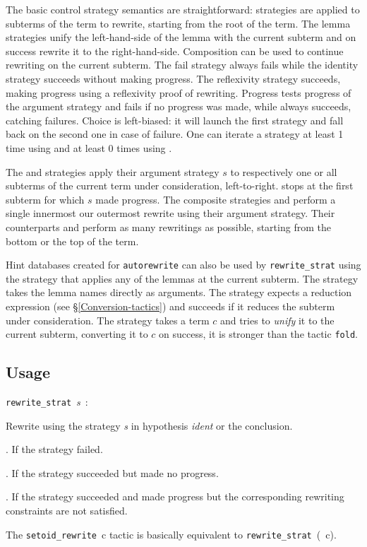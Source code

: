 The basic control strategy semantics are straightforward: strategies are
applied to subterms of the term to rewrite, starting from the root of
the term. The lemma strategies unify the left-hand-side of the
lemma with the current subterm and on success rewrite it to the
right-hand-side. Composition can be used to continue rewriting on the
current subterm. The fail strategy always fails while the identity
strategy succeeds without making progress. The reflexivity strategy
succeeds, making progress using a reflexivity proof of
rewriting. Progress tests progress of the argument strategy and fails if
no progress was made, while  always succeeds, catching
failures. Choice is left-biased: it will launch the first strategy and
fall back on the second one in case of failure. One can iterate a
strategy at least 1 time using  and at least 0 times using
.

The  and  strategies apply their argument
strategy $s$ to respectively one or all subterms of the current term
under consideration, left-to-right.  stops at the first
subterm for which $s$ made progress. The composite strategies
 and  perform a single innermost our outermost
rewrite using their argument strategy. Their counterparts
 and  perform as many rewritings as possible,
starting from the bottom or the top of the term. 

Hint databases created for \texttt{autorewrite} can also be used by
\texttt{rewrite\_strat} using the  strategy that applies any
of the lemmas at the current subterm. The  strategy takes the
lemma names directly as arguments. The  strategy expects a
reduction expression (see \S\ref{Conversion-tactics}) and succeeds if it
reduces the subterm under consideration. The  strategy takes a
term $c$ and tries to \emph{unify} it to the current subterm, converting
it to $c$ on success, it is stronger than the tactic \texttt{fold}. 


\subsection{Usage}

\texttt{rewrite\_strat}~\textit{s}~: 

  Rewrite using the strategy \textit{s} in hypothesis \textit{ident}
  or the conclusion.

  \begin{ErrMsgs}
  \item  {}. If the strategy failed. 
  \item  {}. If the strategy succeeded but
    made no progress.
  \item  {}. 
    If the strategy succeeded and made progress but the corresponding
    rewriting constraints are not satisfied.
  \end{ErrMsgs}
  

The \texttt{setoid\_rewrite}~c tactic is basically equivalent to 
\texttt{rewrite\_strat}~(~c).





